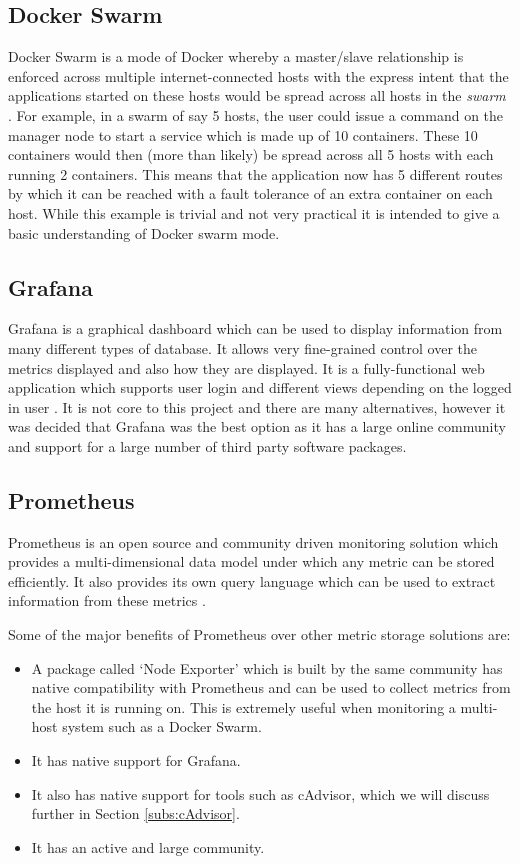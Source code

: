 \subsection{Docker Swarm}
Docker Swarm is a mode of Docker whereby a master/slave relationship is enforced across multiple internet-connected hosts with the express intent that the applications started on these hosts would be spread across all hosts in the \textit{swarm} \citep{Swarm2016}. For example, in a swarm of say 5 hosts, the user could issue a command on the manager node to start a service which is made up of 10 containers. These 10 containers would then (more than likely) be spread across all 5 hosts with each running 2 containers. This means that the application now has 5 different routes by which it can be reached with a fault tolerance of an extra container on each host. While this example is trivial and not very practical it is intended to give a basic understanding of Docker swarm mode.

\subsection{Grafana}
Grafana is a graphical dashboard which can be used to display information from many different types of database. It allows very fine-grained control over the metrics displayed and also how they are displayed. It is a fully-functional web application which supports user login and different views depending on the logged in user \citep{grafana2017}. It is not core to this project and there are many alternatives, however it was decided that Grafana was the best option as it has a large online community and support for a large number of third party software packages.

\subsection{Prometheus}
Prometheus is an open source and community driven monitoring solution which provides a multi-dimensional data model under which any metric can be stored efficiently. It also provides its own query language which can be used to extract information from these metrics \citep{prometheus2017}.

Some of the major benefits of Prometheus over other metric storage solutions are:

\begin{itemize}
	\item A package called `Node Exporter' which is built by the same community has native compatibility with Prometheus and can be used to collect metrics from the host it is running on. This is extremely useful when monitoring a multi-host system such as a Docker Swarm.
	\item It has native support for Grafana.
	\item It also has native support for tools such as cAdvisor, which we will discuss further in Section \ref{subs:cAdvisor}.
	\item It has an active and large community.
\end{itemize}


